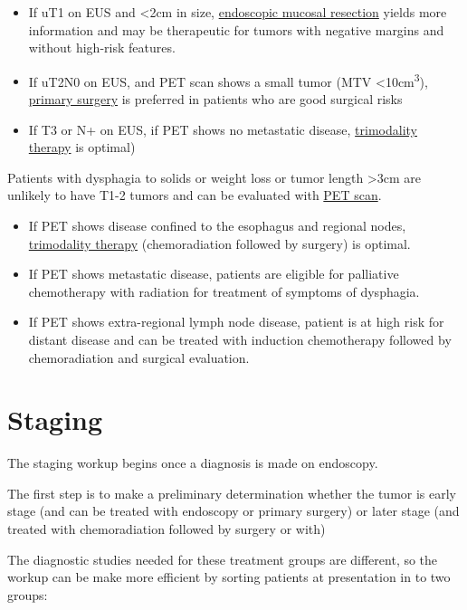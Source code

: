 \documentclass[
]{book}
\providecommand{\tightlist}{%
  \setlength{\itemsep}{0pt}\setlength{\parskip}{0pt}}
\begin{document}
\begin{itemize}
\tightlist
\item
  If uT1 on EUS and \textless2cm in size, \protect\hyperlink{emr}{endoscopic mucosal resection} yields more information and may be therapeutic for tumors with negative margins and without high-risk features.
\item
  If uT2N0 on EUS, and PET scan shows a small tumor (MTV \textless10cm\textsuperscript{3}), \protect\hyperlink{primary_surgery}{primary surgery} is preferred in patients who are good surgical risks
\item
  If T3 or N+ on EUS, if PET shows no metastatic disease, \protect\hyperlink{trimodality}{trimodality therapy} is optimal)
\end{itemize}

Patients with dysphagia to solids or weight loss or tumor length \textgreater3cm are unlikely to have T1-2 tumors and can be evaluated with \protect\hyperlink{pet}{PET scan}.

\begin{itemize}
\tightlist
\item
  If PET shows disease confined to the esophagus and regional nodes, \protect\hyperlink{trimodality}{trimodality therapy} (chemoradiation followed by surgery) is optimal.
\item
  If PET shows metastatic disease, patients are eligible for palliative chemotherapy with radiation for treatment of symptoms of dysphagia.
\item
  If PET shows extra-regional lymph node disease, patient is at high risk for distant disease and can be treated with induction chemotherapy followed by chemoradiation and surgical evaluation.
\end{itemize}

\hypertarget{staging}{%
\chapter{Staging}\label{staging}}

The staging workup begins once a diagnosis is made on endoscopy.

The first step is to make a preliminary determination whether the tumor is early stage (and can be treated with endoscopy or primary surgery) or later stage (and treated with chemoradiation followed by surgery or with)

The diagnostic studies needed for these treatment groups are different, so the workup can be make more efficient by sorting patients at presentation in to two groups:
\end{document}
